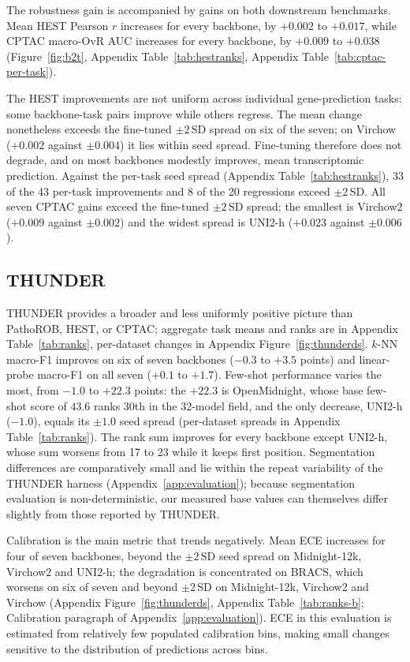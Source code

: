 \documentclass{article}
\begin{document}
The robustness gain is accompanied by gains on both downstream benchmarks. Mean HEST Pearson $r$ increases for every backbone, by $+0.002$ to $+0.017$, while CPTAC macro-OvR AUC increases for every backbone, by $+0.009$ to $+0.038$ (Figure~\ref{fig:b2t}, Appendix Table~\ref{tab:hestranks}, Appendix Table~\ref{tab:cptac-per-task}).

The HEST improvements are not uniform across individual gene-prediction tasks: some backbone-task pairs improve while others regress. The mean change nonetheless exceeds the fine-tuned $\pm2$\,SD spread on six of the seven; on Virchow ($+0.002$ against $\pm0.004$) it lies within seed spread. Fine-tuning therefore does not degrade, and on most backbones modestly improves, mean transcriptomic prediction. Against the per-task seed spread (Appendix Table~\ref{tab:hestranks}), 33 of the 43 per-task improvements and 8 of the 20 regressions exceed $\pm2$\,SD. All seven CPTAC gains exceed the fine-tuned $\pm2$\,SD spread; the smallest is Virchow2 ($+0.009$ against $\pm0.002$) and the widest spread is UNI2-h ($+0.023$ against $\pm0.006$).

\subsection{THUNDER}

THUNDER provides a broader and less uniformly positive picture than PathoROB, HEST, or CPTAC; aggregate task means and ranks are in Appendix Table~\ref{tab:ranks}, per-dataset changes in Appendix Figure~\ref{fig:thunderds}. $k$-NN macro-F1 improves on six of seven backbones ($-0.3$ to $+3.5$ points) and linear-probe macro-F1 on all seven ($+0.1$ to $+1.7$). Few-shot performance varies the most, from $-1.0$ to $+22.3$ points: the $+22.3$ is OpenMidnight, whose base few-shot score of $43.6$ ranks 30th in the 32-model field, and the only decrease, UNI2-h ($-1.0$), equals its $\pm1.0$ seed spread (per-dataset spreads in Appendix Table~\ref{tab:ranks}). The rank sum improves for every backbone except UNI2-h, whose sum worsens from 17 to 23 while it keeps first position. Segmentation differences are comparatively small and lie within the repeat variability of the THUNDER harness (Appendix~\ref{app:evaluation}); because segmentation evaluation is non-deterministic, our measured base values can themselves differ slightly from those reported by THUNDER.

Calibration is the main metric that trends negatively. Mean ECE increases for four of seven backbones, beyond the $\pm2$\,SD seed spread on Midnight-12k, Virchow2 and UNI2-h; the degradation is concentrated on BRACS, which worsens on six of seven and beyond $\pm2$\,SD on Midnight-12k, Virchow2 and Virchow (Appendix Figure~\ref{fig:thunderds}, Appendix Table~\ref{tab:ranks-b}; Calibration paragraph of Appendix~\ref{app:evaluation}). ECE in this evaluation is estimated from relatively few populated calibration bins, making small changes sensitive to the distribution of predictions across bins.
\end{document}
